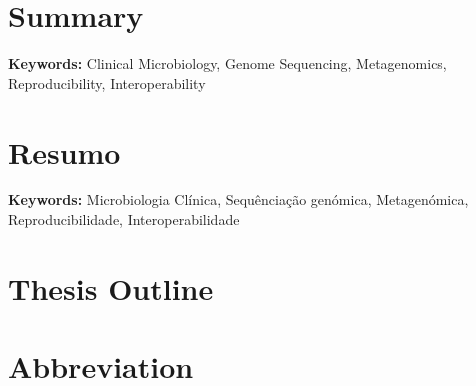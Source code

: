 \documentclass[12pt,a4paper,twoside,openright]{book}
\providecommand{\keywords}[1]{\textbf{Keywords:} #1}
\begin{document}
\begin{sloppy}
\chapter*{Summary}


\keywords{Clinical Microbiology, Genome Sequencing, Metagenomics, Reproducibility, Interoperability}
\clearpage \thispagestyle{empty}\mbox{}\clearpage

\newpage
\thispagestyle{plain}
\chapter*{Resumo}


\keywords{Microbiologia Clínica, Sequênciação genómica, Metagenómica, Reproducibilidade, Interoperabilidade}
\clearpage \thispagestyle{empty}\mbox{}\clearpage

\newpage
\thispagestyle{plain}
\chapter*{Thesis Outline}

\clearpage \thispagestyle{empty}\mbox{}\clearpage

\newpage
\thispagestyle{plain}
\chapter*{Abbreviation}

\clearpage \thispagestyle{empty}\mbox{}\clearpage

\newpage
\thispagestyle{plain}
\renewcommand{\contentsname}{Table of Contents}
\tableofcontents
\clearpage \thispagestyle{empty}\mbox{}\clearpage
\newpage
\thispagestyle{plain}
\listoftables
\clearpage \thispagestyle{empty}\mbox{}\clearpage
\newpage
\thispagestyle{plain}
\listoffigures


\end{sloppy}
\end{document}
